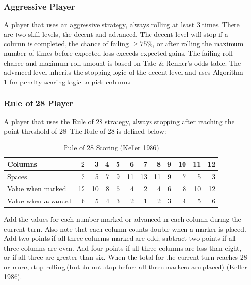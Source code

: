 \documentclass[12pt]{article}
\begin{document}
\begin{thesis}
\subsubsection{Aggressive Player}\label{aggressive-player}

A player that uses an aggressive strategy, always rolling at least 3 times.
There are two skill levels, the decent and advanced.
The decent level will stop if a column is completed, the chance of failing \(\ge75\%\), or after rolling the maximum number of times before expected loss exceeds expected gains. The failing roll chance and maximum roll amount is based on Tate \& Renner's odds table.
The advanced level inherits the stopping logic of the decent level and uses Algorithm 1 for penalty scoring logic to pick columns.

\subsubsection{Rule of 28 Player}\label{rule-of-28-player}

A player that uses the Rule of 28 strategy, always stopping after reaching the point threshold of 28.
The Rule of 28 is defined below:

\begin{table}[H]
\centering
\caption{\label{tab:RO28table}Rule of 28 Scoring (Keller 1986)}
\centering
\begin{tabular}[t]{l|r|r|r|r|r|r|r|r|r|r|r}
\hline
Columns & 2 & 3 & 4 & 5 & 6 & 7 & 8 & 9 & 10 & 11 & 12\\
\hline
Spaces & 3 & 5 & 7 & 9 & 11 & 13 & 11 & 9 & 7 & 5 & 3\\
\hline
Value when marked & 12 & 10 & 8 & 6 & 4 & 2 & 4 & 6 & 8 & 10 & 12\\
\hline
Value when advanced & 6 & 5 & 4 & 3 & 2 & 1 & 2 & 3 & 4 & 5 & 6\\
\hline
\end{tabular}
\end{table}

Add the values for each number marked or advanced in each column during the current turn.
Also note that each column counts double when a marker is placed.
Add two points if all three columns marked are odd; subtract two points if all three columns are even.
Add four points if all three columns are less than eight, or if all three are greater than six.
When the total for the current turn reaches 28 or more, stop rolling (but do not stop before all three markers are placed) (Keller 1986).


\end{thesis}
\end{document}
